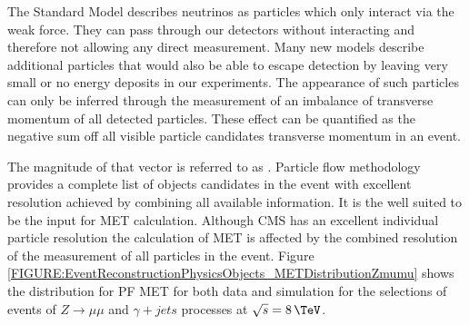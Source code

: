 
The Standard Model describes neutrinos as particles which only interact via the weak force. They can pass through our detectors without interacting and therefore not allowing any direct measurement. Many new models describe additional particles that would also be able to escape detection by leaving very small or no energy deposits in our experiments. The appearance of such particles can only be inferred through the measurement of an imbalance of transverse momentum of all detected particles. These effect can be quantified as the negative sum off all visible particle candidates transverse momentum in an event. 

The magnitude of that vector is referred to as . Particle flow methodology provides a complete list of objects candidates in the event with excellent resolution achieved by combining all available information. It is the well suited to be the input for \gls{MET} calculation. Although \gls{CMS} has an excellent individual particle resolution the calculation of \gls{MET} is affected by the combined resolution of the measurement of all particles in the event. Figure \ref{FIGURE:EventReconstructionPhysicsObjects_METDistributionZmumu} shows the distribution for \gls{PF} \gls{MET} for both data and simulation for the selections of events of $Z \rightarrow \mu\mu$ and $\gamma +jets$ processes at $\sqrt{s}=8\,\TeV$. 

